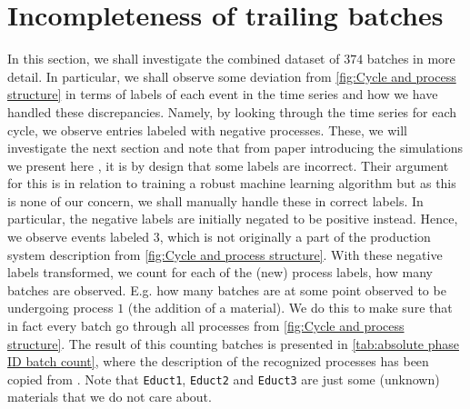 \documentclass[../Thesis.tex]{subfiles}
\begin{document}
\section{Incompleteness of trailing batches}
In this section, we shall investigate the combined dataset of $374$ batches in more detail. In particular, we shall observe some deviation from \autoref{fig:Cycle and process structure} in terms of labels of each event in the time series and how we have handled these discrepancies. Namely, by looking through the time series for each cycle, we observe entries labeled with negative processes. These, we will investigate the next section and note that from paper introducing the simulations we present here \cite{benchmark-model-to-generate-batch-process-data}, it is by design that some labels are incorrect. Their argument for this is in relation to training a robust machine learning algorithm but as this is none of our concern, we shall manually handle these in correct labels. In particular, the negative labels are initially negated to be positive instead. Hence, we observe events labeled $3$, which is not originally a part of the production system description from \autoref{fig:Cycle and process structure}. With these negative labels transformed, we count for each of the (new) process labels, how many batches are observed. E.g. how many batches are at some point observed to be undergoing process $1$ (the addition of a material). We do this to make sure that in fact every batch go through all processes from \autoref{fig:Cycle and process structure}. The result of this counting batches is presented in \autoref{tab:absolute phase ID batch count}, where the description of the recognized processes has been copied from \cite{benchmark-model-to-generate-batch-process-data}. Note that \texttt{Educt1}, \texttt{Educt2} and \texttt{Educt3} are just some (unknown) materials that we do not care about.
\end{document}
